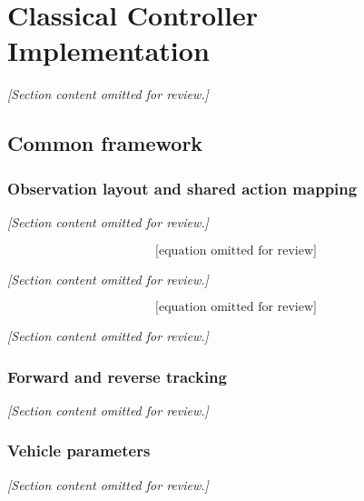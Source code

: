 \chapter{Classical Controller Implementation}
\label{app:classical_controllers}

\textit{[Section content omitted for review.]}

\section{Common framework}
\label{sec:app_cc_common}

\subsection{Observation layout and shared action mapping}
\textit{[Section content omitted for review.]}

\begin{equation}
\text{[equation omitted for review]}
\label{eq:app_cc_obs}
\end{equation}

\textit{[Section content omitted for review.]}

\begin{equation}
\text{[equation omitted for review]}
\label{eq:app_cc_steerrate}
\end{equation}

\textit{[Section content omitted for review.]}

\subsection{Forward and reverse tracking}
\label{sec:app_cc_fwdrev}
\textit{[Section content omitted for review.]}

\subsection{Vehicle parameters}
\textit{[Section content omitted for review.]}

\begin{table}[H]
\centering
\caption{Shunt-truck parameters used by the classical controllers.}
\label{tab:app_cc_params}
\end{table}

